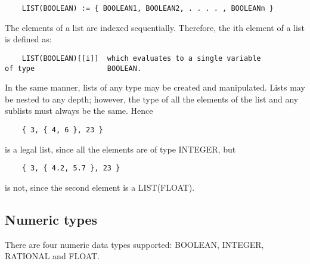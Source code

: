 \begin{verbatim}
	LIST(BOOLEAN) := { BOOLEAN1, BOOLEAN2, . . . . , BOOLEANn }
\end{verbatim}

The elements of a list are indexed sequentially.  Therefore, the ith
element of a list is defined as:

\begin{verbatim}
	LIST(BOOLEAN)[[i]]	which evaluates to a single variable
of type 				BOOLEAN.
\end{verbatim}

\noindent
In the same manner, lists of any type may be created and manipulated.
Lists may be nested to any depth; however, the type of all the elements
of the list and any sublists must always be the same.  Hence

\begin{verbatim}
	{ 3, { 4, 6 }, 23 }
\end{verbatim}

is a legal list, since all the elements are of type INTEGER, but

\begin{verbatim}
	{ 3, { 4.2, 5.7 }, 23 }
\end{verbatim}

is not, since the second element is a LIST(FLOAT).

\subsection{Numeric types}

There are four numeric data types supported: BOOLEAN, INTEGER,
RATIONAL and FLOAT.  

